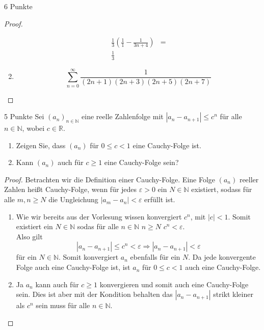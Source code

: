 \documentclass{problemset}
\begin{document}
\begin{problem}{6 Punkte}
\begin{proof}
\begin{enumerate}
\begin{align*}
                  \frac{1}{3} \left(\frac{1}{1} - \frac{1}{3n +4} \right)                                                                                                                                                                        & = \\
                  \frac{1}{3}
              \end{align*}
        \item \[
                  \sum_{n=0}^{\infty} \frac{1}{(2n+1)(2n+3)(2n+5)(2n+7)}
              \]
    \end{enumerate}
\end{proof}
\end{problem}

\begin{problem}{5 Punkte}
Sei $(a_n)_{n\in\mathbb{N}}$ eine reelle Zahlenfolge mit $|a_n - a_{n+1}| \leq c^n$ für alle $n \in \mathbb{N}$, wobei $c \in \mathbb{R}$.
\begin{enumerate}
    \item Zeigen Sie, dass $(a_n)$ für $0 \leq c < 1$ eine Cauchy-Folge ist.
    \item Kann $(a_n)$ auch für $c \geq 1$ eine Cauchy-Folge sein?
\end{enumerate}
\begin{proof}
    Betrachten wir die Definition einer Cauchy-Folge.
    Eine Folge $(a_n)$ reeller Zahlen heißt Cauchy-Folge, wenn für jedes $\varepsilon > 0$ ein $N \in \mathbb{N}$ existiert,
    sodass für alle $m, n \geq N$ die Ungleichung $|a_m - a_n| < \varepsilon$ erfüllt ist.

    \begin{enumerate}
        \item Wie wir bereits aus der Vorlesung wissen konvergiert $c^n$, mit
              $|c| < 1$. Somit existiert ein $N \in \mathbb{N}$ sodas für alle
              $n \in \mathbb{N}$ $n \ge N$ $c^n < \varepsilon$. \\ Also gilt \[
                  |a_n - a_{n+1}| \leq c^n < \varepsilon \Longrightarrow |a_n - a_{n+1}| < \varepsilon
              \] für ein $N \in \mathbb{N}$. Somit konvergiert $a_n$ ebenfalls
                 für ein $N$. Da jede konvergente Folge auch eine Cauchy-Folge
                 ist, ist $a_n$ für $0 \leq c < 1$ auch eine Cauchy-Folge.
        \item Ja $a_n$ kann auch für $c \ge 1$ konvergieren und somit auch eine
              Cauchy-Folge sein. Dies ist aber mit der Kondition behalten das
              $|a_n - a_{n+1}|$ strikt kleiner als $c^n$ sein muss für alle $n
              \in \mathbb{N}$.
    \end{enumerate}
\end{proof}

\end{problem}
\end{document}
